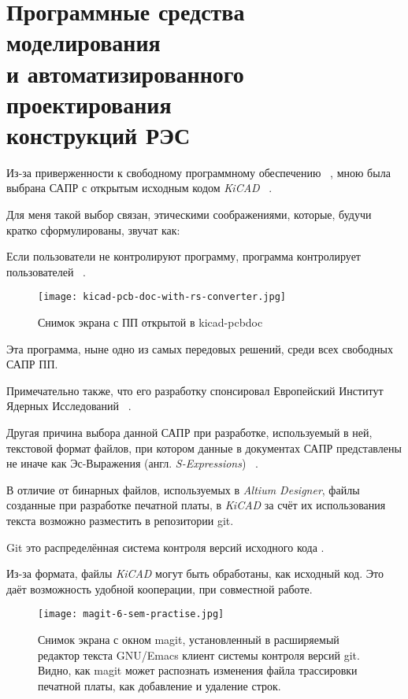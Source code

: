 \section{Программные средства моделирования \\
  и автоматизированного проектирования \\
  конструкций РЭС}


Из-за приверженности к
свободному программному обеспечению ~\cite{GNU-philosophy},
мною была выбрана САПР
с открытым исходным кодом \textit{KiCAD} ~\cite{kicad-license}.


Для меня такой выбор связан,
этическими соображениями, которые,
будучи кратко сформулированы,
звучат как:

Если пользователи не контролируют программу,
программа контролирует пользователей ~\cite{ufair-nonfree-programs}.


\begin{figure}[H]
  \centering
  \texttt{[image: kicad-pcb-doc-with-rs-converter.jpg]}
  \caption{Снимок экрана с ПП открытой в kicad-pcbdoc}
\end{figure}


Эта программа, ныне одно из самых передовых решений,
среди всех свободных САПР ПП.

Примечательно также, что его разработку спонсировал
Европейский Институт Ядерных Исследований ~\cite{kicad-sponsors}.

Другая причина выбора данной САПР при разработке,
используемый в ней, текстовой формат файлов,
при котором данные в документах САПР представлены
не иначе как Эс-Выражения (англ. \textit{S-Expressions})
~\cite{kicad-sexpr}.

В отличие от бинарных файлов,
используемых в \textit{Altium Designer},
файлы созданные при разработке печатной платы,
в \textit{KiCAD} за счёт их использования текста
возможно разместить в репозитории git.

Git это распределённая система контроля версий 
исходного кода \cite{git-dvcs}.

Из-за формата,
файлы \textit{KiCAD} могут быть обработаны,
как исходный код.
Это даёт возможность удобной кооперации, при совместной работе.

\begin{figure}[H]
  \centering
  \texttt{[image: magit-6-sem-practise.jpg]}
  \caption{Снимок экрана с окном magit,
    установленный в расширяемый редактор текста GNU/Emacs
    клиент системы контроля версий git.
    Видно, как magit может распознать изменения файла трассировки печатной платы,
    как добавление и удаление строк.}
\end{figure}


